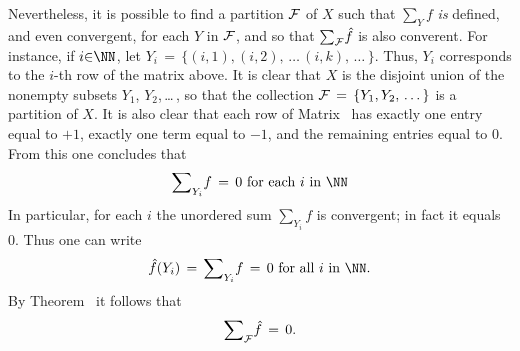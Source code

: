         Nevertheless, it is possible to find a partition ${\cal F}$ of $X$ such that ${\sum}_{Y} f$ {\em is} defined, and even convergent, for each $Y$ in ${\cal F}$, and so that ${\sum}_{{\cal F}} \hat{f}$ is also converent.
    For instance, if $i{\in}{\NN}$, let $Y_{i} \,=\, \{(i,1), (i,2),\,{\ldots}\,(i,k),\,{\ldots}\,\}$.
    Thus, $Y_{i}$ corresponds to the $i$-th row of the matrix above.
    It is clear that $X$ is the disjoint union of the nonempty subsets $Y_{1}$, $Y_{2}$,\,{\ldots}\,, so that the collection ${\cal F} \,=\, \{Y_{1},Y_{2},\,{\ldots}\,\}$ is a partition of $X$.
    It is also clear that each row of Matrix~ has exactly one entry equal to $+1$, exactly one term equal to $-1$, and the remaining entries equal to $0$.
    From this one concludes that
        \begin{displaymath}
        {\sum}_{Y_{i}} f \,=\, 0 \mbox{ for each $i$ in ${\NN}$}
        \end{displaymath}
    In particular, for each $i$ the unordered sum ${\sum}_{Y_{i}} f$ is convergent; in fact it equals~$0$.
    Thus one can write
        \begin{displaymath}
        \hat{f}(Y_{i}) \,=\, {\sum}_{Y_{i}} f \,=\, 0 \mbox{ for all $i$ in ${\NN}$}.
        \end{displaymath}
    By Theorem~ it follows that
        \begin{displaymath}
        {\sum}_{{\cal F}} \hat{f} \,=\, 0.
        \end{displaymath}

